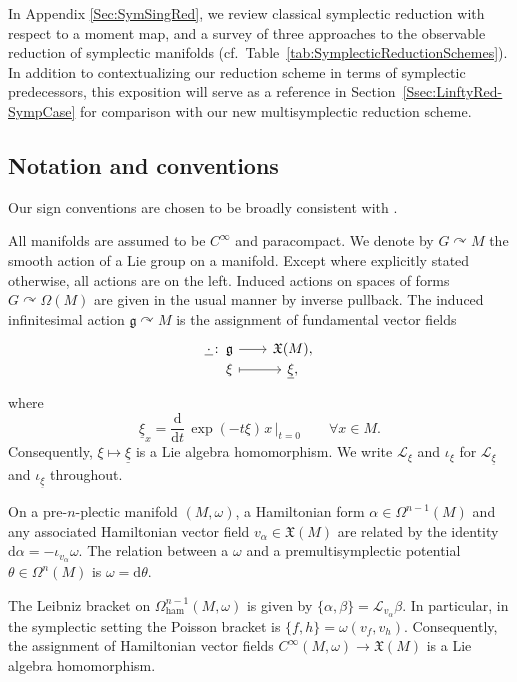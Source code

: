 \documentclass[pdftex]{sigma}
\numberwithin{equation}{section}
\DeclareMathOperator{\action}{\curvearrowright}
\newcommand{\g}{\mathfrak{g}}
\newcommand{\ham}{\text{ham}}
\renewcommand{\L}{\mathscr{L}}
\newcommand{\X}{\mathfrak{X}}
\renewcommand{\d}{\mathrm{d}}
\newcommand{\morphism}[5]{%
  \begin{tikzcd}[
    column sep=2em,
    row sep=-.5ex,
    ampersand replacement=\&
  ]
  #1\colon~ \&[-3em]
  #2\vphantom{#3} \arrow[r] \&
  #3\vphantom{#2} \\
  \&
  #4\vphantom{#5} \arrow[r,mapsto] \&
  #5\vphantom{#4}
  \end{tikzcd}%
}
\begin{document}
In Appendix \ref{Sec:SymSingRed}, we review classical symplectic reduction with respect to a moment map, and a survey of three approaches to the observable reduction of symplectic manifolds (cf.\ Table~\ref{tab:SymplecticReductionSchemes}). In addition to contextualizing our reduction scheme in terms of symplectic predecessors, this exposition will serve as a reference in Section~\ref{Ssec:LinftyRed-SympCase} for comparison with our new multisymplectic reduction scheme.



\setcounter{section}{1}
\setcounter{Theorem}{0}


\subsection*{Notation and conventions}

Our sign conventions are chosen to be broadly consistent with \cite{CalliesFregierRogersZambon16}.

All manifolds are assumed to be $C^\infty$ and paracompact.
We denote by $G\action M$ the smooth action of a Lie group on a manifold.
Except where explicitly stated otherwise, all actions are on the left.
Induced actions on spaces of forms $G\curvearrowright\Omega(M)$ are given in the usual manner by inverse pullback.
The induced infinitesimal action $\g\curvearrowright M$ is the assignment of fundamental vector fields
\[
	\morphism{\underline{\,\cdot\,}}
	{\mathfrak{g}}
	{\mathfrak{X}(M),}
	{\xi}
	{\underline\xi,}
\]
where
\[
	\underline\xi_x = \dfrac{\d}{\d t}\,\exp{(-t \xi)}\hspace{1pt}x \,\Big|_{t=0}
	\qquad \forall x \in M.
\]
Consequently, $\xi\mapsto\underline\xi$ is a Lie algebra homomorphism. We write $\L_\xi$ and $\iota_\xi$ for $\L_{\underline\xi}$ and $\iota_{\underline\xi}$ throughout.

On a pre-$n$-plectic manifold $(M,\omega)$, a Hamiltonian form $\alpha\in\Omega^{n-1}(M)$ and any associated Hamiltonian vector field $v_\alpha \in\X(M)$ are related by the identity $\d\alpha=-\iota_{v_\alpha}\omega$.
The relation between a $\omega$ and a premultisymplectic potential $\theta\in\Omega^n(M)$ is $\omega=\d\theta$.

The Leibniz bracket on $\Omega_\ham^{n-1}(M,\omega)$ is given by $\{\alpha,\beta\}= \L_{v_\alpha}\beta$.
In particular, in the symplectic setting the Poisson bracket is $\{f,h\}=\omega(v_f,v_h)$.
Consequently, the assignment of Hamiltonian vector fields $C^{\infty}(M,\omega)\to \mathfrak X(M)$ is a Lie algebra homomorphism.
\end{document}

